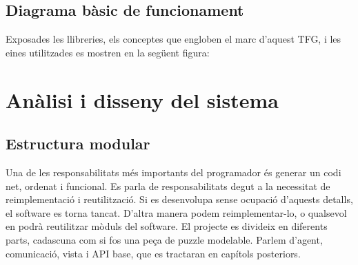 \documentclass[letterpaper,11pt,catalan]{sphinxmanual}
\begin{document}
\begin{sphinxVerbatim}[commandchars=\\\{\}]
  \PYG{p}{[}
   
   
\PYG{p}{]}

\end{sphinxVerbatim}


\section{Diagrama bàsic de funcionament}
\label{\detokenize{index:diagrama-basic-de-funcionament}}
Exposades les llibreries, els conceptes que engloben el marc d'aquest TFG, i les eines
utilitzades es mostren en la següent figura:



\chapter{Anàlisi i disseny del sistema}
\label{\detokenize{index:analisi-i-disseny-del-sistema}}

\section{Estructura modular}
\label{\detokenize{index:estructura-modular}}
Una de les responsabilitats més importants del programador és generar un codi net, ordenat
i funcional. Es parla de responsabilitats degut a la necessitat de reimplementació i reutilització.
Si es desenvolupa sense ocupació d'aquests detalls, el software es torna tancat. D'altra manera podem
reimplementar-lo,
o qualsevol en podrà reutilitzar mòduls del software.
El projecte es divideix en diferents parts, cadascuna com si fos una peça de puzzle modelable.
Parlem d'agent, comunicació, vista i API base, que es tractaran en capítols posteriors.
\end{document}
